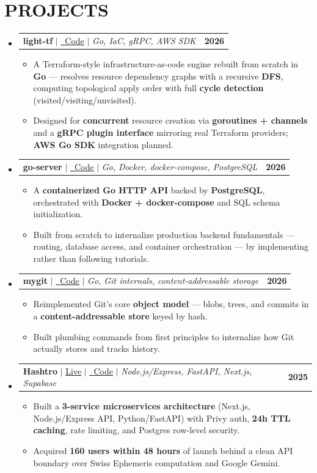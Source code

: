 \documentclass[letterpaper,10pt]{article}
\makeatletter
\newcommand{\resumeItem}[1]{
  \item\small{
    {#1 \vspace{-2pt}}
  }
}
\newcommand{\resumeProjectHeading}[2]{
    \item
    \begin{tabular*}{1.001\textwidth}{l@{\extracolsep{\fill}}r}
      \small#1 & \textbf{\small #2}\\
    \end{tabular*}\vspace{-6pt}
}
\newcommand{\resumeSubHeadingListStart}{\begin{itemize}[leftmargin=0.0in, label={}]}
\newcommand{\resumeSubHeadingListEnd}{\end{itemize}}
\newcommand{\resumeItemListStart}{\begin{itemize}}
\newcommand{\resumeItemListEnd}{\end{itemize}\vspace{-4pt}}
\makeatother
\begin{document}
\section{PROJECTS}
  \resumeSubHeadingListStart
  \resumeProjectHeading
    {\textbf{light-tf} $|$ \href{https://github.com/harshkas4na/light-tf}{\raisebox{-0.1\height}\faGithub\ \underline{Code}} $|$ \textit{Go, IaC, gRPC, AWS SDK}}{2026}
    \resumeItemListStart
      \resumeItem{A Terraform-style infrastructure-as-code engine rebuilt from scratch in \textbf{Go} --- resolves resource dependency graphs with a recursive \textbf{DFS}, computing topological apply order with full \textbf{cycle detection} (visited/visiting/unvisited).}
      \resumeItem{Designed for \textbf{concurrent} resource creation via \textbf{goroutines + channels} and a \textbf{gRPC plugin interface} mirroring real Terraform providers; \textbf{AWS Go SDK} integration planned.}
    \resumeItemListEnd

  \resumeProjectHeading
    {\textbf{go-server} $|$ \href{https://github.com/harshkas4na/go-server}{\raisebox{-0.1\height}\faGithub\ \underline{Code}} $|$ \textit{Go, Docker, docker-compose, PostgreSQL}}{2026}
    \resumeItemListStart
      \resumeItem{A \textbf{containerized Go HTTP API} backed by \textbf{PostgreSQL}, orchestrated with \textbf{Docker + docker-compose} and SQL schema initialization.}
      \resumeItem{Built from scratch to internalize production backend fundamentals --- routing, database access, and container orchestration --- by implementing rather than following tutorials.}
    \resumeItemListEnd

  \resumeProjectHeading
    {\textbf{mygit} $|$ \href{https://github.com/harshkas4na/mygit}{\raisebox{-0.1\height}\faGithub\ \underline{Code}} $|$ \textit{Go, Git internals, content-addressable storage}}{2026}
    \resumeItemListStart
      \resumeItem{Reimplemented Git's core \textbf{object model} --- blobs, trees, and commits in a \textbf{content-addressable store} keyed by hash.}
      \resumeItem{Built plumbing commands from first principles to internalize how Git actually stores and tracks history.}
    \resumeItemListEnd

  \resumeProjectHeading
    {\textbf{Hashtro} $|$ \href{https://hashtro.fun/}{\underline{Live}} $|$ \href{https://github.com/harshkas4na/Hashtro}{\raisebox{-0.1\height}\faGithub\ \underline{Code}} $|$ \textit{Node.js/Express, FastAPI, Next.js, Supabase}}{2025}
    \resumeItemListStart
      \resumeItem{Built a \textbf{3-service microservices architecture} (Next.js, Node.js/Express API, Python/FastAPI) with Privy auth, \textbf{24h TTL caching}, rate limiting, and Postgres row-level security.}
      \resumeItem{Acquired \textbf{160 users within 48 hours} of launch behind a clean API boundary over Swiss Ephemeris computation and Google Gemini.}
    \resumeItemListEnd
  \resumeSubHeadingListEnd
\end{document}
